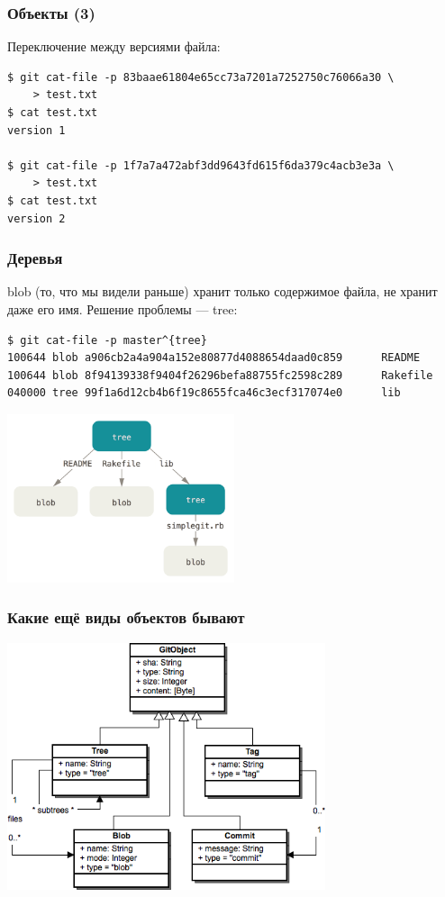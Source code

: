 \documentclass{../../slides-style}
\begin{document}
	\begin{frame}[fragile]
		\frametitle{Объекты (3)}
		Переключение между версиями файла:
		\begin{verbatim}
$ git cat-file -p 83baae61804e65cc73a7201a7252750c76066a30 \
    > test.txt
$ cat test.txt
version 1

$ git cat-file -p 1f7a7a472abf3dd9643fd615f6da379c4acb3e3a \
    > test.txt
$ cat test.txt
version 2
		\end{verbatim}
	\end{frame}

	\begin{frame}[fragile]
		\frametitle{Деревья}
		blob (то, что мы видели раньше) хранит только содержимое файла, не хранит даже его имя. Решение проблемы --- tree:
		\begin{scriptsize}
		\begin{verbatim}
$ git cat-file -p master^{tree}
100644 blob a906cb2a4a904a152e80877d4088654daad0c859      README
100644 blob 8f94139338f9404f26296befa88755fc2598c289      Rakefile
040000 tree 99f1a6d12cb4b6f19c8655fca46c3ecf317074e0      lib
		\end{verbatim}
		\end{scriptsize}
		\begin{center}
			\includegraphics[width=0.5\textwidth]{gitTreeObject.png}
		\end{center}
	\end{frame}

	\begin{frame}
		\frametitle{Какие ещё виды объектов бывают}
		\begin{center}
			\includegraphics[width=0.7\textwidth]{gitDataStructure.png}
		\end{center}
	\end{frame}
\end{document}
